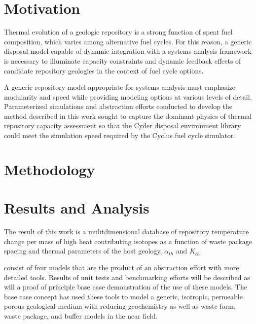\documentclass{anstrans}
\begin{document}
\section{Motivation}
Thermal evolution of a geologic repository is a strong function of spent fuel 
composition, which varies among alternative fuel cycles. For this reason, a 
generic disposal model capable of dynamic integration with a systems analysis 
framework is necessary to illuminate capacity constraints and dynamic feedback 
effects of candidate repository geologies in the context of fuel cycle options.

A generic repository model appropriate for systems analysis must emphasize 
modularity and speed while providing modeling options at various levels of 
detail. Parameterized simulations and abstraction efforts conducted to develop 
the method described in this work sought to capture the dominant physics of 
thermal repository capacity assessment so that the Cyder disposal environment 
library could meet the simulation speed required by the Cyclus fuel cycle 
simulator.

\section{Methodology}






\section{Results and Analysis}

The result of this work is a mulitdimensional database of repository temperature 
change per mass of high heat contributing isotopes as a function of waste
package spacing and thermal parameters of the host geology, $\alpha_{th}$ and $K_{th}$. 

consist of four models that are the product of an 
abstraction effort with more detailed tools. Results of unit tests and 
benchmarking efforts will be described as will a proof of principle base case 
demonstration of the use of these models. The base case concept has used these 
tools to model a generic, isotropic, permeable porous geological medium with 
reducing geochemistry as well as waste form, waste package, and buffer models in 
the near field.
\end{document}
